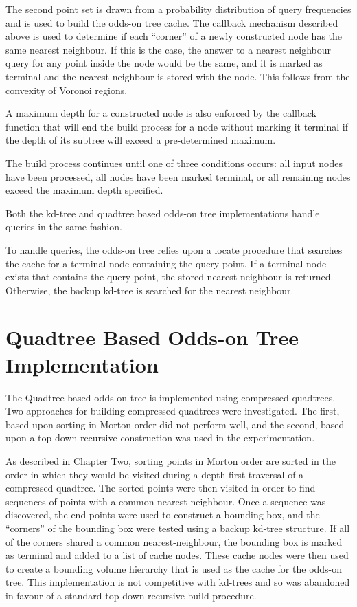 \documentclass[mcs]{scsthesis}
\begin{document}
The second point set is drawn from a probability distribution of query
frequencies and is used to build the odds-on tree cache. The callback mechanism
described above is used to determine if each ``corner'' of a newly constructed
node has the same nearest neighbour. If this is the case, the answer to a
nearest neighbour query for any point inside the node would be the same, and it
is marked as terminal and the nearest neighbour is stored with the node. This
follows from the convexity of Voronoi regions.

A maximum depth for a constructed node is also enforced by the callback
function that will end the build process for a node without marking it
terminal if the depth of its subtree will exceed a pre-determined maximum.

The build process continues until one of three conditions occurs: all input nodes
have been processed, all nodes have been marked terminal, or all remaining nodes
exceed the maximum depth specified.

Both the kd-tree and quadtree based odds-on tree implementations handle queries
in the same fashion.

To handle queries, the odds-on tree relies upon a locate procedure that searches
the cache for a terminal node containing the query point. If a terminal node
exists that contains the query point, the stored nearest neighbour is returned.
Otherwise, the backup kd-tree is searched for the nearest neighbour.

\section{Quadtree Based Odds-on Tree Implementation}

The Quadtree based odds-on tree is implemented using compressed quadtrees. Two
approaches for building compressed quadtrees were investigated. The first,
based upon sorting in Morton order did not perform well, and the second, based
upon a top down recursive construction was used in the experimentation.

As described in Chapter Two, sorting points in Morton order are sorted in the
order in which they would be visited during a depth first traversal of a
compressed quadtree. The sorted points were then visited in order to find
sequences of points with a common nearest neighbour. Once a sequence was
discovered, the end points were used to construct a bounding box, and the
``corners'' of the bounding box were tested using a backup kd-tree structure.
If all of the corners shared a common nearest-neighbour, the bounding box is
marked as terminal and added to a list of cache nodes. These cache nodes were
then used to create a bounding volume hierarchy that is used as the cache for
the odds-on tree. This implementation is not competitive with kd-trees and so
was abandoned in favour of a standard top down recursive build procedure.
\end{document}
